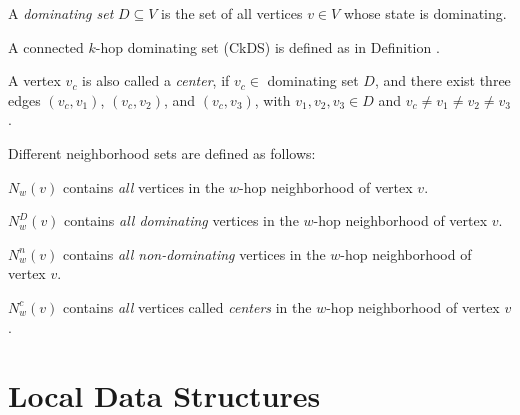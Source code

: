 \begin{definition}\label{defdomset}

A \emph{dominating set} $D \subseteq V$ is the set of all vertices $v\in V$ whose state is dominating.

\end{definition}

A connected $k$-hop dominating set (CkDS) is defined as in Definition .

 
\begin{definition}\label{defcenter}
 
 A vertex $v_c$ is also called a \emph{center}, if $v_c \in$ dominating set $D$, and there exist three edges $(v_c, v_1)$, $(v_c, v_2)$, and $(v_c, v_3)$, with $v_1, v_2, v_3 \in D$ and $v_c\neq v_1\neq v_2\neq v_3$. 
 
\end{definition}



Different neighborhood sets are defined as follows: 

\begin{definition}\label{defnall}

$N_w(v)$ contains \emph{all} vertices in the $w$-hop neighborhood of vertex $v$. 

\end{definition}

\begin{definition}\label{defndom}

$N_w^D(v)$ contains \emph{all dominating} vertices in the $w$-hop neighborhood of vertex $v$. 

\end{definition}

\begin{definition}\label{defnondom}

$N_w^n(v)$ contains \emph{all non-dominating} vertices in the $w$-hop neighborhood of vertex $v$. 

\end{definition}

\begin{definition}\label{defncenter}

$N_w^c(v)$ contains \emph{all} vertices called \emph{centers} in the $w$-hop neighborhood of vertex $v$. 

\end{definition}



\section{Local Data Structures}\label{slds}\label{sec_lds}

